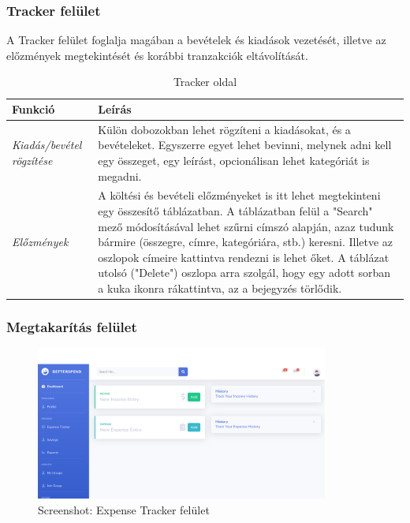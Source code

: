 \subsubsection{Tracker felület}
A Tracker felület foglalja magában a bevételek és kiadások vezetését, illetve az előzmények megtekintését és korábbi tranzakciók eltávolítását.
\begin{table}[H]
	\centering
	\begin{tabular}{ | m{} | m{} | }
		\hline
		\textbf{Funkció} & \textbf{Leírás} \\
		\hline \hline
		\emph{Kiadás/bevétel rögzítése} & Külön dobozokban lehet rögzíteni a kiadásokat, és a bevételeket. Egyszerre egyet lehet bevinni, melynek adni kell egy összeget, egy leírást, opcionálisan lehet kategóriát is megadni. \\
		\hline
		\emph{Előzmények} &  A költési és bevételi előzményeket is itt lehet megtekinteni egy összesítő táblázatban. A táblázatban felül a "Search" mező módosításával lehet szűrni címszó alapján, azaz tudunk bármire (összegre, címre, kategóriára, stb.) keresni. Illetve az oszlopok címeire kattintva rendezni is lehet őket. A táblázat utolsó ("Delete") oszlopa arra szolgál, hogy egy adott sorban a kuka ikonra rákattintva, az a bejegyzés törlődik.  \\
		\hline
	\end{tabular}
	\caption{Tracker oldal}
	\label{tab:expense-tracker}
\end{table}

\subsubsection{Megtakarítás felület}
\begin{figure}[H]
	\centering
	\includegraphics[height=190px]{img/expense-tracker-screenshot}
	\caption{Screenshot: Expense Tracker felület}
	\label{fig:expense-tracker}
\end{figure}

